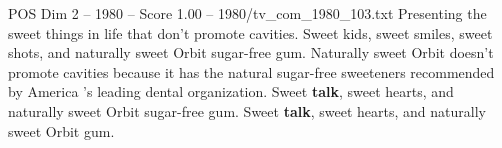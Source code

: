 \begin{textsample}{POS Dim 2 – 1980 – Score 1.00 – 1980/tv\_com\_1980\_103.txt}  \label{ex:f2_pos_067}
Presenting the sweet things in life that don't promote cavities.
Sweet kids, sweet smiles, sweet shots, and naturally sweet Orbit sugar-free gum.
Naturally sweet Orbit doesn't promote cavities because it has the natural sugar-free sweeteners recommended by America 's leading dental organization.
Sweet \textbf{talk}, sweet hearts, and naturally sweet Orbit sugar-free gum.
Sweet \textbf{talk}, sweet hearts, and naturally sweet Orbit gum.

\end{textsample}
